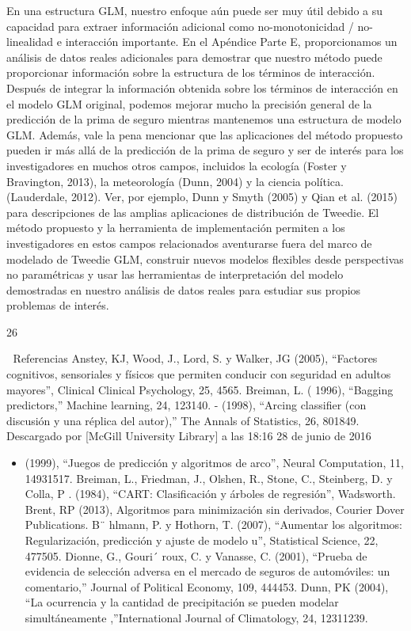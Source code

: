 \documentclass[]{article}
\providecommand{\tightlist}{%
  \setlength{\itemsep}{0pt}\setlength{\parskip}{0pt}}
\begin{document}
En una estructura GLM, nuestro enfoque aún puede ser muy útil debido a
su capacidad para extraer información adicional como no-monotonicidad /
no-linealidad e interacción importante. En el Apéndice Parte E,
proporcionamos un análisis de datos reales adicionales para demostrar
que nuestro método puede proporcionar información sobre la estructura de
los términos de interacción. Después de integrar la información obtenida
sobre los términos de interacción en el modelo GLM original, podemos
mejorar mucho la precisión general de la predicción de la prima de
seguro mientras mantenemos una estructura de modelo GLM. Además, vale la
pena mencionar que las aplicaciones del método propuesto pueden ir más
allá de la predicción de la prima de seguro y ser de interés para los
investigadores en muchos otros campos, incluidos la ecología (Foster y
Bravington, 2013), la meteorología (Dunn, 2004) y la ciencia política.
(Lauderdale, 2012). Ver, por ejemplo, Dunn y Smyth (2005) y Qian et al.
(2015) para descripciones de las amplias aplicaciones de distribución de
Tweedie. El método propuesto y la herramienta de implementación permiten
a los investigadores en estos campos relacionados aventurarse fuera del
marco de modelado de Tweedie GLM, construir nuevos modelos flexibles
desde perspectivas no paramétricas y usar las herramientas de
interpretación del modelo demostradas en nuestro análisis de datos
reales para estudiar sus propios problemas de interés.

26

 Referencias Anstey, KJ, Wood, J., Lord, S. y Walker, JG (2005),
``Factores cognitivos, sensoriales y físicos que permiten conducir con
seguridad en adultos mayores'', Clinical Clinical Psychology, 25, 4565.
Breiman, L. ( 1996), ``Bagging predictors,'' Machine learning, 24,
123140. - (1998), ``Arcing classifier (con discusión y una réplica del
autor),'' The Annals of Statistics, 26, 801849. Descargado por {[}McGill
University Library{]} a las 18:16 28 de junio de 2016

\begin{itemize}
\tightlist
\item
  (1999), ``Juegos de predicción y algoritmos de arco'', Neural
  Computation, 11, 14931517. Breiman, L., Friedman, J., Olshen, R.,
  Stone, C., Steinberg, D. y Colla, P . (1984), ``CART: Clasificación y
  árboles de regresión'', Wadsworth. Brent, RP (2013), Algoritmos para
  minimización sin derivados, Courier Dover Publications. B¨ hlmann, P.
  y Hothorn, T. (2007), ``Aumentar los algoritmos: Regularización,
  predicción y ajuste de modelo u'', Statistical Science, 22, 477505.
  Dionne, G., Gouri´ roux, C. y Vanasse, C. (2001), ``Prueba de
  evidencia de selección adversa en el mercado de seguros de
  automóviles: un comentario,'' Journal of Political Economy, 109,
  444453. Dunn, PK (2004), ``La ocurrencia y la cantidad de
  precipitación se pueden modelar simultáneamente ,''International
  Journal of Climatology, 24, 12311239.
\end{itemize}
\end{document}
